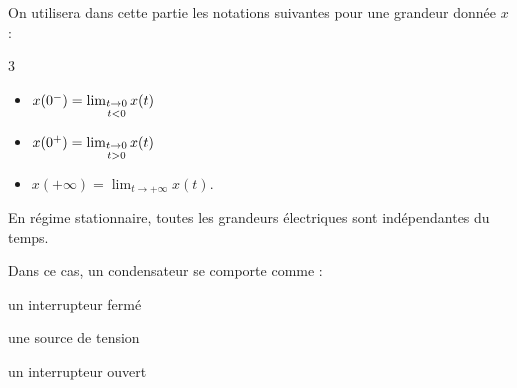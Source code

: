 On utilisera dans cette partie les notations suivantes pour une grandeur donnée $x$ :
\begin{multicols}{3}
\begin{itemize}
	\item $x(0^-) = \lim_{ \begin{subarray}{c}{t\to 0}\\[0.5mm]{t<0}\end{subarray} } x(t)$
	\item $x(0^+) = \lim_{ \begin{subarray}{c}{t\to 0}\\[0.5mm]{t>0}\end{subarray} } x(t)$
	\item $x(+\infty) =  \lim_{t \to + \infty } x(t)$.
\end{itemize}  
\end{multicols}

\minusSmallskip


\hauteurLargeurCadreReponse		{6mm}{1cm}
\initialisationEntrainement


En régime stationnaire, toutes les grandeurs électriques sont indépendantes du temps.

\debutEntrainement


\begin{enonce}
Dans ce cas, un condensateur se comporte comme :
\begin{listeQCM3Colonnes}
\item un interrupteur fermé
\item une source de tension
\item un interrupteur ouvert
\end{listeQCM3Colonnes}
\bigskip
\end{enonce}

